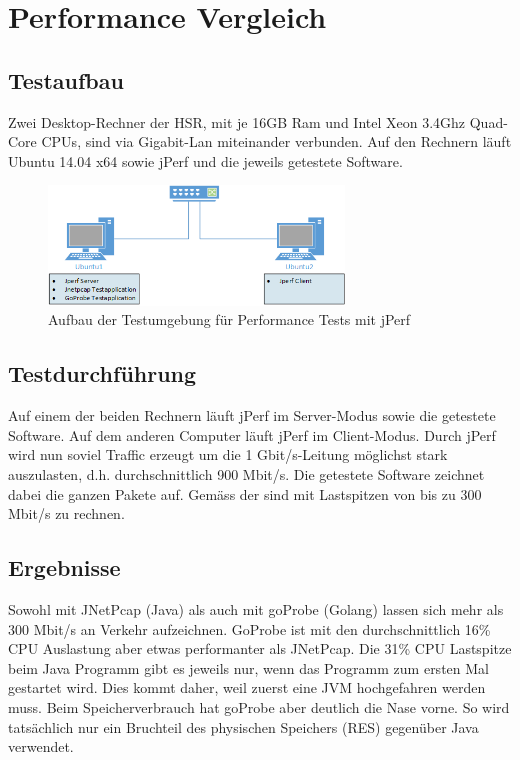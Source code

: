 \section{Performance Vergleich}
\label{sec:Performance Vergleich}

\subsection{Testaufbau}
Zwei Desktop-Rechner der HSR, mit je 16GB Ram und Intel Xeon 3.4Ghz Quad-Core CPUs, sind via Gigabit-Lan miteinander verbunden. Auf den Rechnern läuft Ubuntu 14.04 x64 sowie jPerf und die jeweils getestete Software.

\begin{figure}[H]
    \begin{center}
		\includegraphics[width=0.7\textwidth]{start/img/PerformanceEvaluation.png}
    \end{center}
    \caption{Aufbau der Testumgebung für Performance Tests mit jPerf}
\end{figure}

\subsection{Testdurchführung}
Auf einem der beiden Rechnern läuft jPerf im Server-Modus sowie die getestete Software. Auf dem anderen Computer läuft jPerf im Client-Modus.
Durch jPerf wird nun soviel Traffic erzeugt um die 1 Gbit/s-Leitung möglichst stark auszulasten, d.h. durchschnittlich 900 Mbit/s. Die getestete Software zeichnet dabei die ganzen Pakete auf. Gemäss der \osag{} sind mit Lastspitzen von bis zu 300 Mbit/s zu rechnen.

\subsection{Ergebnisse}
Sowohl mit JNetPcap (Java) als auch mit goProbe (Golang) lassen sich mehr als 300 Mbit/s an Verkehr aufzeichnen. GoProbe ist mit den durchschnittlich 16\% CPU Auslastung aber etwas performanter als JNetPcap. Die 31\% CPU Lastspitze beim Java Programm gibt es jeweils nur, wenn das Programm zum ersten Mal gestartet wird. Dies kommt daher, weil zuerst eine \acs{JVM} hochgefahren werden muss.
Beim Speicherverbrauch hat goProbe aber deutlich die Nase vorne. So wird tatsächlich nur ein Bruchteil des physischen Speichers (RES\footnotemark[2]) gegenüber Java verwendet.

